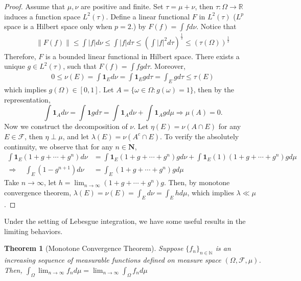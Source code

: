 \documentclass[11pt,english]{smfart}
\newtheorem{theorem}{Theorem}[subsection]
\newcommand{\mb}{\mathbb}
\newcommand{\mc}{\mathcal}
\newcommand{\mf}{\mathbf}
\begin{document}
\begin{proof}
    
    Assume that $\mu,\nu$ are positive and finite. Set $\tau = \mu +\nu$, then $\tau : \Omega \rightarrow \mb{R}$ induces a function space $L^2(\tau)$. Define a linear functional $F$ in $L^2 (\tau)$ ($L^p$ space is a Hilbert space only when $p=2$.) by $F(f) = \int f d\nu$. Notice that 
    \begin{align*}
        \parallel F(f) \parallel  \leq \int |f| d\nu \leq \int |f| d\tau \leq \left(\int |f|^2 d\tau\right)^{\frac{1}{2}} \leq (\tau(\Omega))^\frac{1}{2}
    \end{align*}
    Therefore, $F$ is a bounded linear functional in Hilbert space. There exists a unique $g\in L^2(\tau)$, such that $F(f) = \int fgd\tau$. Moreover, \begin{align*}
        0\leq \nu(E) =\int \mf{1}_E d\nu  = \int \mf{1}_{E} g d\tau = \int_E g d\tau \leq \tau(E)
    \end{align*}
    which implies $g(\Omega) \in [0,1]$. Let $A = \{\omega\in \Omega: g(\omega) = 1\}$, then by the representation,
    $$\int \mf{1}_A d\nu = \int \mf{1} g d\tau = \int \mf{1}_A d\nu + \int \mf{1}_A g d\mu \Rightarrow \mu(A) = 0.$$
    Now we construct the decomposition of $\nu$. Let $\eta (E) = \nu(A\cap E)$ for any $E\in \mc{F}$, then $\eta \perp \mu$, and let $\lambda(E) = \nu(A^c \cap E)$. To verify the absolutely continuity, we observe that for any $n\in \mf{N}$, \begin{align*}
        \int \mf{1}_E (1+g  +\cdots +g^n) d\nu &= \int \mf{1}_E (1+g +\cdots + g^n) gd\nu + \int \mf{1}_E (1)(1+g +\cdots + g^n) gd\mu \\
        \Rightarrow \quad \int_E (1-g^{n+1}) d\nu &= \int_E (1+g +\cdots + g^n) gd\mu
    \end{align*}
    Take $n\rightarrow \infty$, let $h = \lim_{n\rightarrow \infty} (1+g +\cdots + g^n) g$. Then, by monotone convergence theorem, 
    $\lambda(E) = \nu(E) = \int_E d\nu = \int_E hd\mu$, which implies $\lambda \ll \mu$.


\end{proof}

Under the setting of Lebesgue integration, we have some useful results in the limiting behaviors. \\
\begin{theorem}[Monotone Convergence Theorem]
    Suppose $\{f_n\}_{n\in \mb{N}}$ is an increasing sequence of measurable functions defined on measure space $(\Omega,\mc{F},\mu)$. Then, $\int_\Omega\lim_{n\rightarrow \infty}f_n d\mu = \lim_{n\rightarrow \infty} \int_\Omega f_n d\mu $
\end{theorem}
\end{document}

